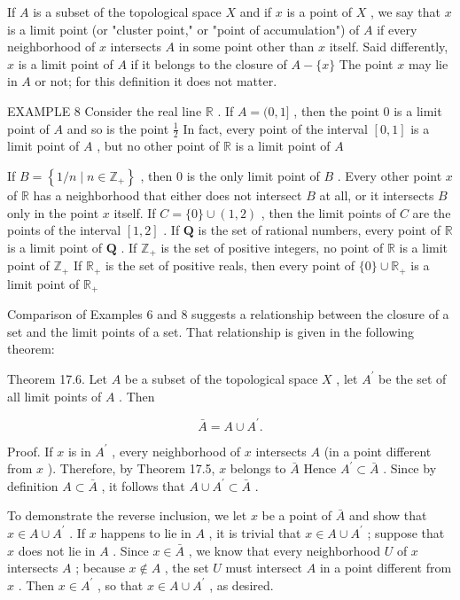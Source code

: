\documentclass[10pt]{article}
\begin{document}
If \(A\) is a subset of the topological space \(X\) and if \(x\) is a point of \(X\) , we say that \(x\) is a limit point (or "cluster point," or "point of accumulation") of \(A\) if every neighborhood of \(x\) intersects \(A\) in some point other than \(x\) itself. Said differently, \(x\) is a limit point of \(A\) if it belongs to the closure of \(A - \{ x\}\) The point \(x\) may lie in \(A\) or not; for this definition it does not matter.

EXAMPLE 8 Consider the real line \(\mathbb{R}\) . If \(A = (0,1\rbrack\) , then the point 0 is a limit point of \(A\) and so is the point \(\frac{1}{2}\) In fact, every point of the interval \(\left\lbrack  {0,1}\right\rbrack\) is a limit point of \(A\) , but no other point of \(\mathbb{R}\) is a limit point of \(A\)

If \(B = \left\{  {1/n \mid  n \in  {\mathbb{Z}}_{ + }}\right\}\) , then 0 is the only limit point of \(B\) . Every other point \(x\) of \(\mathbb{R}\) has a neighborhood that either does not intersect \(B\) at all, or it intersects \(B\) only in the point \(x\) itself. If \(C = \{ 0\}  \cup  \left( {1,2}\right)\) , then the limit points of \(C\) are the points of the interval \(\left\lbrack  {1,2}\right\rbrack\) . If \(\mathbf{Q}\) is the set of rational numbers, every point of \(\mathbb{R}\) is a limit point of \(\mathbf{Q}\) . If \({\mathbb{Z}}_{ + }\) is the set of positive integers, no point of \(\mathbb{R}\) is a limit point of \({\mathbb{Z}}_{ + }\) If \({\mathbb{R}}_{ + }\) is the set of positive reals, then every point of \(\{ 0\}  \cup  {\mathbb{R}}_{ + }\) is a limit point of \({\mathbb{R}}_{ + }\)

Comparison of Examples 6 and 8 suggests a relationship between the closure of a set and the limit points of a set. That relationship is given in the following theorem:

Theorem 17.6. Let \(A\) be a subset of the topological space \(X\) , let \({A}^{\prime }\) be the set of all limit points of \(A\) . Then

\[
\bar{A} = A \cup  {A}^{\prime }.
\]

Proof. If \(x\) is in \({A}^{\prime }\) , every neighborhood of \(x\) intersects \(A\) (in a point different from \(x\) ). Therefore, by Theorem 17.5, \(x\) belongs to \(\bar{A}\) Hence \({A}^{\prime } \subset  \bar{A}\) . Since by definition \(A \subset  \bar{A}\) , it follows that \(A \cup  {A}^{\prime } \subset  \bar{A}\) .

To demonstrate the reverse inclusion, we let \(x\) be a point of \(\bar{A}\) and show that \(x \in  A \cup  {A}^{\prime }\) . If \(x\) happens to lie in \(A\) , it is trivial that \(x \in  A \cup  {A}^{\prime }\) ; suppose that \(x\) does not lie in \(A\) . Since \(x \in  \bar{A}\) , we know that every neighborhood \(U\) of \(x\) intersects \(A\) ; because \(x \notin  A\) , the set \(U\) must intersect \(A\) in a point different from \(x\) . Then \(x \in  {A}^{\prime }\) , so that \(x \in  A \cup  {A}^{\prime }\) , as desired.
\end{document}
